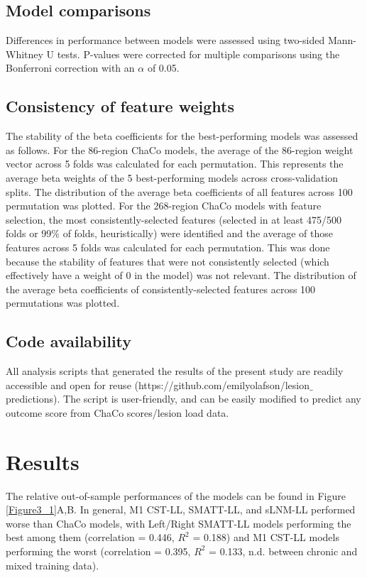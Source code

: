 \documentclass[phd,tocprelim]{cornell}
\begin{document}
\subsection{Model comparisons}
Differences in performance between models were assessed using two-sided Mann-Whitney U tests. P-values were corrected for multiple comparisons using the Bonferroni correction with an $\alpha$ of 0.05. 

\subsection{Consistency of feature weights}
The stability of the beta coefficients for the best-performing models was assessed as follows. For the 86-region ChaCo models, the average of the 86-region weight vector across 5 folds was calculated for each permutation. This represents the average beta weights of the 5 best-performing models across cross-validation splits. The distribution of the average beta coefficients of all features across 100 permutation was plotted. For the 268-region ChaCo models with feature selection, the most consistently-selected features (selected in at least 475/500 folds or 99$\%$ of folds, heuristically) were identified and the average of those features across 5 folds was calculated for each permutation. This was done because the stability of features that were not consistently selected (which effectively have a weight of 0 in the model) was not relevant. The distribution of the average beta coefficients of consistently-selected features across 100 permutations was plotted. 

\subsection{Code availability}
All analysis scripts that generated the results of the present study are readily accessible and open for reuse (https://github.com/emilyolafson/lesion$\_$predictions). The script is user-friendly, and can be easily modified to predict any outcome score from ChaCo scores/lesion load data.

\section{Results}


The relative out-of-sample performances of the models can be found in Figure \ref{Figure3_1}A,B. In general, M1 CST-LL, SMATT-LL, and sLNM-LL performed worse than ChaCo models, with Left/Right SMATT-LL models performing the best among them (correlation = 0.446, $R^2$ = 0.188) and M1 CST-LL models performing the worst (correlation = 0.395, $R^2$ = 0.133, n.d. between chronic and mixed training data). 
\end{document}
